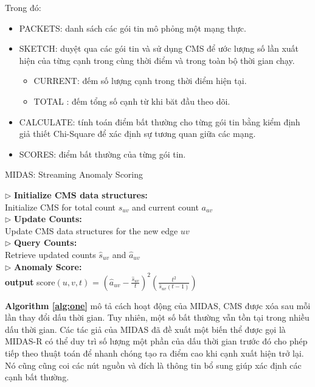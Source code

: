 Trong đó:
\begin{itemize}
    \item PACKETS: danh sách các gói tin mô phỏng một mạng thực.
    \item SKETCH: duyệt qua các gói tin và sử dụng CMS để ước lượng
          số lần xuất hiện của từng cạnh trong cùng thời điểm và trong toàn
          bộ thời gian chạy.
          \begin{itemize}
              \item CURRENT: đếm số lượng cạnh trong thời điểm hiện tại.
              \item TOTAL : đếm tổng số cạnh từ khi băt đầu theo dõi.
          \end{itemize}
    \item CALCULATE: tính toán điểm bất thường cho từng gói tin bằng kiểm định giả thiết Chi-Square để xác định sự tương quan giữa các mạng.
    \item SCORES: điểm bất thường của từng gói tin.
\end{itemize}


{}

\begin{algorithm}[H]
    \caption{MIDAS: Streaming Anomaly Scoring}\label{alg:one}
    $\triangleright$ \textbf{ Initialize CMS data structures:}\\
    Initialize CMS for total count $s_{uv}$ and current count $a_{av}$\\
     {
        $\triangleright$  \textbf{Update Counts:}\\
        Update CMS data structures for the new edge $uv$\\
        $\triangleright$  \textbf{Query Counts:}\\
        Retrieve updated counts $\hat{s}_{uv}$ and $\hat{a}_{uv}$\\
        $\triangleright$  \textbf{Anomaly Score:}\\
        \textbf{output} score$(u,v,t)$ = $(\hat{a}_{uv} - \frac{\hat{s}_{uv}}{t})^2(\frac{t^2}{\hat{s}_{uv}(t-1)})$
    }
\end{algorithm}


\textbf{Algorithm \ref*{alg:one}} mô tả cách hoạt động của MIDAS, CMS được xóa sau mỗi lần thay đổi dấu thời gian. Tuy nhiên, một số bất thường vẫn tồn tại trong nhiều
dấu thời gian. Các tác giả của MIDAS đã đề xuất một biến thể được gọi là MIDAS-R có thể  duy trì
số lượng một phần của dấu thời gian trước đó cho phép tiếp theo
thuật toán để nhanh chóng tạo ra điểm cao khi cạnh xuất hiện trở lại. Nó cũng cũng coi các nút nguồn và đích là thông tin bổ sung
giúp xác định các cạnh bất thường.



